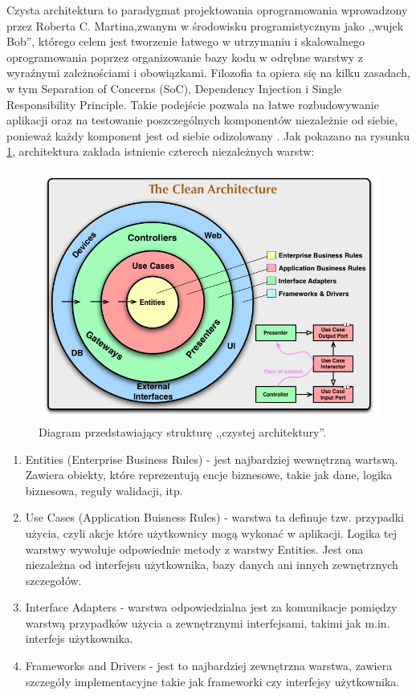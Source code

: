 Czysta architektura to paradygmat projektowania oprogramowania wprowadzony przez Roberta C. Martina,zwanym w środowisku programistycznym jako ,,wujek Bob'', którego celem jest tworzenie łatwego w utrzymaniu i skalowalnego oprogramowania poprzez organizowanie bazy kodu w odrębne warstwy z wyraźnymi zależnościami i obowiązkami. Filozofia ta opiera się na kilku zasadach, w tym Separation of Concerns (SoC), Dependency Injection i Single Responsibility Principle.
Takie podejście pozwala na łatwe rozbudowywanie aplikacji oraz na testowanie poszczególnych komponentów niezależnie od siebie, ponieważ każdy komponent jest od siebie odizolowany \cite{cleanArchitecture}.
Jak pokazano na rysunku \ref{fig:clean_atchitecture}, architektura zakłada istnienie czterech niezależnych warstw:

\begin{figure}[H]
    \centering
    \includegraphics[width=0.75\linewidth]{figs/clean_architecture.png}
    \caption{Diagram przedstawiający strukturę ,,czystej architektury''.}
    \label{fig:clean_atchitecture}
\end{figure}

\begin{enumerate}
    \item Entities (Enterprise Business Rules) - jest najbardziej wewnętrzną wartswą. Zawiera obiekty, które reprezentują encje biznesowe, takie jak dane, logika biznesowa, reguły walidacji, itp.
    \item Use Cases (Application Buisness Rules) - warstwa ta definuje tzw. przypadki użycia, czyli akcje które użytkownicy mogą wykonać w aplikacji. Logika tej warstwy wywołuje odpowiednie metody z warstwy Entities. Jest ona niezależna od interfejsu użytkownika, bazy danych ani innych zewnętrznych szczegołów.
    \item Interface Adapters - warstwa odpowiedzialna jest za komunikacje pomiędzy warstwą przypadków użycia a zewnętrznymi interfejsami, takimi jak m.in. interfejs użytkownika.
    \item Frameworks and Drivers - jest to najbardziej zewnętrzna warstwa, zawiera szczegóły implementacyjne takie jak frameworki czy interfejsy użytkownika.
\end{enumerate}

